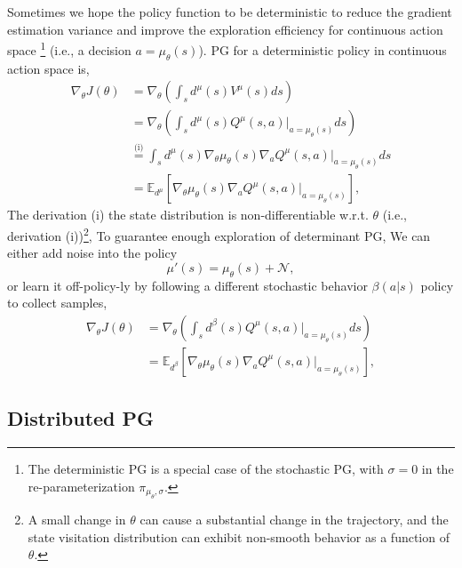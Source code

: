 Sometimes we hope the policy function to be deterministic to reduce the gradient estimation variance and improve the exploration efficiency for continuous action space \footnote{The deterministic PG is a special case of the stochastic PG, with $\sigma=0$ in the re-parameterization $\pi_{\mu_{\theta}, \sigma}$.} (i.e., a decision $a=\mu_{\theta}(s)$). PG for a deterministic policy in continuous action space is,
\begin{equation}\label{equ:pgthem-deterministic}
        \begin{aligned}  
            \nabla_{\theta} J(\theta) &=\nabla_{\theta} \left(\int_s d^\mu(s) V^\mu(s) ds\right)\\
            &=\nabla_{\theta} \left(\int_s d^\mu(s) Q^\mu(s,a)|_{a=\mu_{\theta}(s)}ds\right)\\
            &\stackrel{\text{(i)}}{=}\int_s d^\mu(s) \nabla_{\theta} \mu_{\theta}(s) \nabla_a Q^\mu(s,a)|_{a=\mu_{\theta}(s)} ds 
            \\
            &=\mathbb{E}_{d^\mu} [ \nabla_{\theta} \mu_{\theta}(s) \nabla_a Q^\mu(s,a)|_{a=\mu_{\theta}(s)}],
        \end{aligned}
\end{equation}
The derivation (i) the state distribution is non-differentiable w.r.t. $\theta$ (i.e., derivation (i))\footnote{A small change in $\theta$ can cause a substantial change in the trajectory, and the state visitation distribution can exhibit non-smooth behavior as a function of $\theta$.}, To guarantee enough exploration of determinant PG, We can either add noise into the policy 
\begin{equation}
    \mu'(s) = \mu_{\theta}(s) + \mathcal{N},
\end{equation} 
or learn it off-policy-ly by following a different stochastic behavior $\beta(a|s)$ policy to collect samples,
\begin{equation}\label{equ:pgthem-deterministic-offpolicy}
        \begin{aligned}  
            \nabla_{\theta} J(\theta) &=\nabla_{\theta} \left(\int_s d^\beta(s) Q^\mu(s,a)|_{a=\mu_{\theta}(s)}ds\right)\\
            &=\mathbb{E}_{d^\beta} [ \nabla_{\theta} \mu_{\theta}(s) \nabla_a Q^\mu(s,a)|_{a=\mu_{\theta}(s)}],
        \end{aligned}
\end{equation}

\subsection{Distributed PG}

